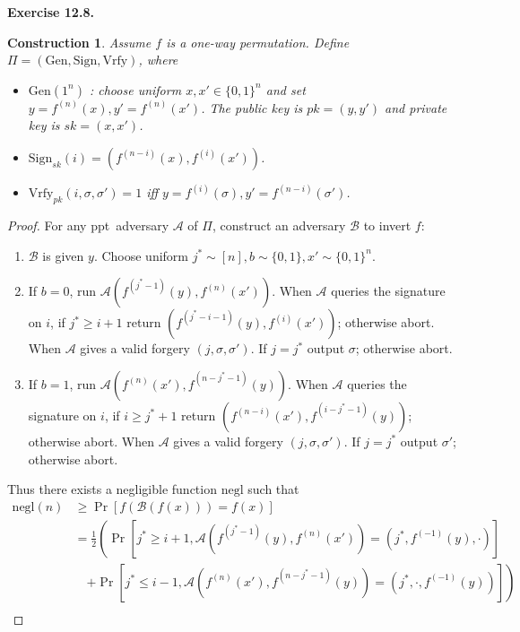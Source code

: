 \documentclass[a4paper]{article}
\newtheorem{construction}{Construction}
\newtheorem*{proof}{Proof}
\newenvironment{exercise}[1]{
	\par
	\noindent\textbf{Exercise #1.}\quad
}{
	\par
	\bigskip
}
\newcommand{\pbra}[1]{\left( #1 \right)}
\newcommand{\sbra}[1]{\left[ #1 \right]}
\newcommand{\bin}{\{0,1\}}
\newcommand{\Gen}{\mathrm{Gen}}
\newcommand{\Sign}{\mathrm{Sign}}
\newcommand{\Vrfy}{\mathrm{Vrfy}}
\newcommand{\negl}{\mathrm{negl}}
\newcommand{\ppt}{{\sc ppt}~}
\newcommand{\Acal}{\mathcal{A}}
\newcommand{\Bcal}{\mathcal{B}}
\begin{document}
\begin{exercise}{12.8}
\begin{itemize}
        \begin{construction}
            Assume $f$ is a one-way permutation. Define $\Pi=(\Gen,\Sign,\Vrfy)$, where
            \begin{itemize}
                \item $\Gen(1^n)$ : choose uniform $x,x'\in\bin^n$ and set $y=f^{(n)}(x),y'=f^{(n)}(x')$. 
                    The public key is $pk=(y,y')$ and private key is $sk=(x,x')$.
                \item $\Sign_{sk}(i)=\pbra{f^{(n-i)}(x),f^{(i)}(x')}$.
                \item $\Vrfy_{pk}(i,\sigma,\sigma')=1$ iff $y=f^{(i)}(\sigma),y'=f^{(n-i)}(\sigma')$.
            \end{itemize}
        \end{construction}
        \begin{proof}
            For any \ppt adversary $\Acal$ of $\Pi$, construct an adversary $\Bcal$ to invert $f$:
            \begin{enumerate}
                \item $\Bcal$ is given $y$. Choose uniform $j^*\sim[n],b\sim\bin,x'\sim\bin^n$.
                \item If $b=0$, run $\Acal\pbra{f^{(j^*-1)}(y),f^{(n)}(x')}$. When $\Acal$ queries the signature on $i$,
                    if $j^*\geq i+1$ return $\pbra{f^{(j^*-i-1)}(y),f^{(i)}(x')}$; otherwise abort.
                    When $\Acal$ gives a valid forgery $(j,\sigma,\sigma')$.
                    If $j=j^*$ output $\sigma$; otherwise abort.
                \item If $b=1$, run $\Acal\pbra{f^{(n)}(x'),f^{(n-j^*-1)}(y)}$. When $\Acal$ queries the signature on $i$,
                    if $i\geq j^*+1$ return $\pbra{f^{(n-i)}(x'),f^{(i-j^*-1)}(y)}$; otherwise abort.
                    When $\Acal$ gives a valid forgery $(j,\sigma,\sigma')$.
                    If $j=j^*$ output $\sigma'$; otherwise abort.
            \end{enumerate}
            Thus there exists a negligible function $\negl$ such that
            \begin{align*}
                \negl(n)&\geq\Pr\sbra{f(\Bcal(f(x)))=f(x)}\\
                &=\frac12\left(
                \Pr\sbra{j^*\geq i+1,\Acal\pbra{f^{(j^*-1)}(y),f^{(n)}(x')}=\pbra{j^*,f^{(-1)}(y),\cdot}}\right.\\
                &\quad
                \left.+\Pr\sbra{j^*\leq i-1,\Acal\pbra{f^{(n)}(x'),f^{(n-j^*-1)}(y)}=\pbra{j^*,\cdot,f^{(-1)}(y)}}\right)\\

\end{align*}
\end{proof}
\end{itemize}
\end{exercise}
\end{document}

